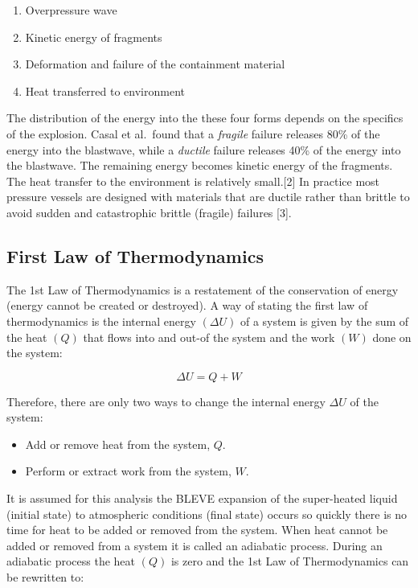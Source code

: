 \documentclass[10pt,parskip=half,
toc=sectionentrywithdots,
bibliography=totocnumbered,
captions=tableheading,numbers=noendperiod]{scrartcl}
\providecommand{\tightlist}{%
  \setlength{\itemsep}{0pt}\setlength{\parskip}{0pt}}
\begin{document}
\begin{enumerate}
\def\labelenumi{\arabic{enumi}.}
\tightlist
\item
  Overpressure wave
\item
  Kinetic energy of fragments
\item
  Deformation and failure of the containment material
\item
  Heat transferred to environment
\end{enumerate}

The distribution of the energy into the these four forms depends on the
specifics of the explosion. Casal et al.~found that a \emph{fragile}
failure releases 80\% of the energy into the blastwave, while a
\emph{ductile} failure releases 40\% of the energy into the blastwave.
The remaining energy becomes kinetic energy of the fragments. The heat
transfer to the environment is relatively small.{[}2{]} In practice most
pressure vessels are designed with materials that are ductile rather
than brittle to avoid sudden and catastrophic brittle (fragile) failures
{[}3{]}.

\hypertarget{first-law-of-thermodynamics}{%
\subsection{First Law of
Thermodynamics}\label{first-law-of-thermodynamics}}

The 1st Law of Thermodynamics is a restatement of the conservation of
energy (energy cannot be created or destroyed). A way of stating the
first law of thermodynamics is the internal energy \((\Delta U)\) of a
system is given by the sum of the heat \((Q)\) that flows into and
out-of the system and the work \((W)\) done on the system:

\begin{equation}\Delta U = Q+W\end{equation}

Therefore, there are only two ways to change the internal energy
\(\Delta U\) of the system:

\begin{itemize}
\tightlist
\item
  Add or remove heat from the system, \(Q\).
\item
  Perform or extract work from the system, \(W\).
\end{itemize}

It is assumed for this analysis the BLEVE expansion of the super-heated
liquid (initial state) to atmospheric conditions (final state) occurs so
quickly there is no time for heat to be added or removed from the
system. When heat cannot be added or removed from a system it is called
an adiabatic process. During an adiabatic process the heat \((Q)\) is
zero and the 1st Law of Thermodynamics can be rewritten to:
\end{document}
